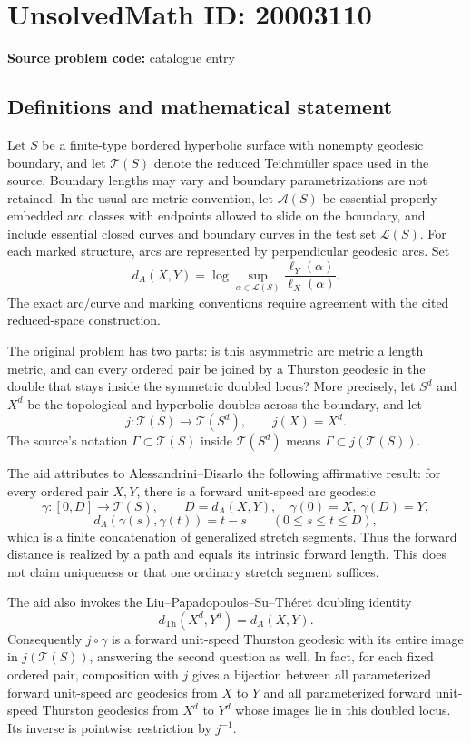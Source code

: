 \documentclass[11pt]{article}
\begin{document}
\section*{UnsolvedMath ID: 20003110}
\textbf{Source problem code:} catalogue entry
\subsection{Definitions and mathematical statement}
Let $S$ be a finite-type bordered hyperbolic surface with nonempty geodesic boundary, and let $\mathcal T(S)$ denote the reduced Teichm\"uller space used in the source. Boundary lengths may vary and boundary parametrizations are not retained. In the usual arc-metric convention, let $\mathcal A(S)$ be essential properly embedded arc classes with endpoints allowed to slide on the boundary, and include essential closed curves and boundary curves in the test set $\mathcal L(S)$. For each marked structure, arcs are represented by perpendicular geodesic arcs. Set
\[
d_A(X,Y)=\log\sup_{\alpha\in\mathcal L(S)}\frac{\ell_Y(\alpha)}{\ell_X(\alpha)}.
\]
The exact arc/curve and marking conventions require agreement with the cited reduced-space construction.

The original problem has two parts: is this asymmetric arc metric a length metric, and can every ordered pair be joined by a Thurston geodesic in the double that stays inside the symmetric doubled locus? More precisely, let $S^d$ and $X^d$ be the topological and hyperbolic doubles across the boundary, and let
\[
j:\mathcal T(S)\longrightarrow\mathcal T(S^d),\qquad j(X)=X^d.
\]
The source's notation $\Gamma\subset\mathcal T(S)$ inside $\mathcal T(S^d)$ means $\Gamma\subset j(\mathcal T(S))$.

The aid attributes to Alessandrini--Disarlo the following affirmative result: for every ordered pair $X,Y$, there is a forward unit-speed arc geodesic
\[
\gamma:[0,D]\to\mathcal T(S),\qquad D=d_A(X,Y),\quad
\gamma(0)=X,\ \gamma(D)=Y,
\]
\[
d_A(\gamma(s),\gamma(t))=t-s\qquad(0\leq s\leq t\leq D),
\]
which is a finite concatenation of generalized stretch segments. Thus the forward distance is realized by a path and equals its intrinsic forward length. This does not claim uniqueness or that one ordinary stretch segment suffices.

The aid also invokes the Liu--Papadopoulos--Su--Th\'eret doubling identity
\[
d_{\mathrm{Th}}(X^d,Y^d)=d_A(X,Y).
\]
Consequently $j\circ\gamma$ is a forward unit-speed Thurston geodesic with its entire image in $j(\mathcal T(S))$, answering the second question as well. In fact, for each fixed ordered pair, composition with $j$ gives a bijection between all parameterized forward unit-speed arc geodesics from $X$ to $Y$ and all parameterized forward unit-speed Thurston geodesics from $X^d$ to $Y^d$ whose images lie in this doubled locus. Its inverse is pointwise restriction by $j^{-1}$.
\end{document}
